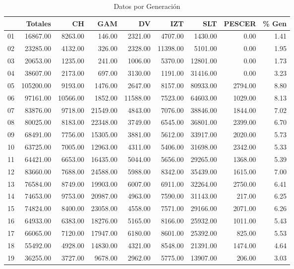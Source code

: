 \documentclass{article}
\begin{document}
\begin{table}[ht]
\centering
\caption{Datos por Generación} 
\begin{tabular}{rrrrrrrrr}
  \hline
 & Totales & CH & GAM & DV & IZT & SLT & PESCER & \% Gen \\ 
  \hline
01 & 16867.00 & 8263.00 & 146.00 & 2321.00 & 4707.00 & 1430.00 & 0.00 & 1.41 \\ 
  02 & 23285.00 & 4132.00 & 326.00 & 2328.00 & 11398.00 & 5101.00 & 0.00 & 1.95 \\ 
  03 & 20653.00 & 1235.00 & 241.00 & 1006.00 & 5370.00 & 12801.00 & 0.00 & 1.73 \\ 
  04 & 38607.00 & 2173.00 & 697.00 & 3130.00 & 1191.00 & 31416.00 & 0.00 & 3.23 \\ 
  05 & 105200.00 & 9193.00 & 1476.00 & 2647.00 & 8157.00 & 80933.00 & 2794.00 & 8.80 \\ 
  06 & 97161.00 & 10566.00 & 1852.00 & 11588.00 & 7523.00 & 64603.00 & 1029.00 & 8.13 \\ 
  07 & 83876.00 & 9718.00 & 21549.00 & 4843.00 & 7076.00 & 38846.00 & 1844.00 & 7.02 \\ 
  08 & 80025.00 & 8183.00 & 22348.00 & 3749.00 & 6545.00 & 36801.00 & 2399.00 & 6.70 \\ 
  09 & 68491.00 & 7756.00 & 15305.00 & 3881.00 & 5612.00 & 33917.00 & 2020.00 & 5.73 \\ 
  10 & 63725.00 & 7005.00 & 12963.00 & 4311.00 & 5406.00 & 31698.00 & 2342.00 & 5.33 \\ 
  11 & 64421.00 & 6653.00 & 16435.00 & 5044.00 & 5656.00 & 29265.00 & 1368.00 & 5.39 \\ 
  12 & 83660.00 & 7688.00 & 24588.00 & 5988.00 & 8342.00 & 35439.00 & 1615.00 & 7.00 \\ 
  13 & 76584.00 & 8749.00 & 19903.00 & 6007.00 & 6911.00 & 32264.00 & 2750.00 & 6.41 \\ 
  14 & 74653.00 & 9753.00 & 20987.00 & 4963.00 & 7590.00 & 31143.00 & 217.00 & 6.25 \\ 
  15 & 74824.00 & 8400.00 & 23058.00 & 4558.00 & 7571.00 & 29166.00 & 2071.00 & 6.26 \\ 
  16 & 64933.00 & 6383.00 & 18276.00 & 5165.00 & 8166.00 & 25932.00 & 1011.00 & 5.43 \\ 
  17 & 66065.00 & 7120.00 & 17947.00 & 6180.00 & 8601.00 & 25392.00 & 825.00 & 5.53 \\ 
  18 & 55492.00 & 4928.00 & 14830.00 & 4321.00 & 8548.00 & 21391.00 & 1474.00 & 4.64 \\ 
  19 & 36255.00 & 3727.00 & 9678.00 & 2962.00 & 5775.00 & 13907.00 & 206.00 & 3.03 \\ 
   \hline
\end{tabular}
\end{table}
\end{document}
